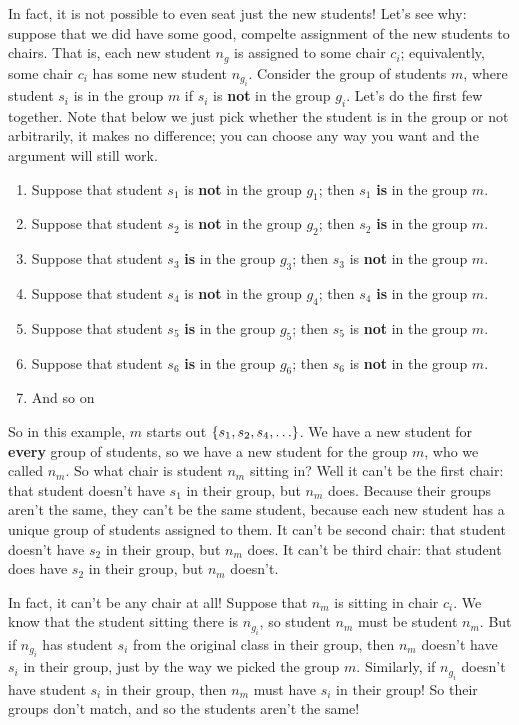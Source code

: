 In fact, it is not possible to even seat just the new students!
Let's see why: suppose that we did have some good, compelte assignment of the new students to chairs.
That is, each new student $n_g$ is assigned to some chair $c_i$; equivalently, some chair $c_i$ has some new student $n_{g_i}$.
Consider the group of students $m$, where student $s_i$ is in the group $m$ if $s_i$ is \textbf{not} in the group $g_i$.
Let's do the first few together.
Note that below we just pick whether the student is in the group or not arbitrarily, it makes no difference; you can choose any way you want and the argument will still work.

\begin{enumerate}
    \item Suppose that student $s_1$ is \textbf{not} in the group $g_1$; then $s_1$ \textbf{is} in the group $m$.
    \item Suppose that student $s_2$ is \textbf{not} in the group $g_2$; then $s_2$ \textbf{is} in the group $m$.
    \item Suppose that student $s_3$ \textbf{is} in the group $g_3$; then $s_3$ is \textbf{not} in the group $m$.
    \item Suppose that student $s_4$ is \textbf{not} in the group $g_4$; then $s_4$ \textbf{is} in the group $m$.
    \item Suppose that student $s_5$ \textbf{is} in the group $g_5$; then $s_5$ is \textbf{not} in the group $m$.
    \item Suppose that student $s_6$ \textbf{is} in the group $g_6$; then $s_6$ is \textbf{not} in the group $m$.
    \item And so on
\end{enumerate}

So in this example, $m$ starts out ${\left\{ {s_1, s_2, s_4, \ldots} \right\}}$.
We have a new student for \textbf{every} group of students, so we have a new student for the group $m$, who we called $n_m$.
So what chair is student $n_m$ sitting in?
Well it can't be the first chair: that student doesn't have $s_1$ in their group, but $n_m$ does.
Because their groups aren't the same, they can't be the same student, because each new student has a unique group of students assigned to them.
It can't be second chair: that student doesn't have $s_2$ in their group, but $n_m$ does.
It can't be third chair: that student does have $s_2$ in their group, but $n_m$ doesn't.

In fact, it can't be any chair at all!
Suppose that $n_m$ is sitting in chair $c_i$.
We know that the student sitting there is $n_{g_i}$, so student $n_m$ must be student $n_m$.
But if $n_{g_i}$ has student $s_i$ from the original class in their group, then $n_m$ doesn't have $s_i$ in their group, just by the way we picked the group $m$.
Similarly, if $n_{g_i}$ doesn't have student $s_i$ in their group, then $n_m$ must have $s_i$ in their group!
So their groups don't match, and so the students aren't the same!

